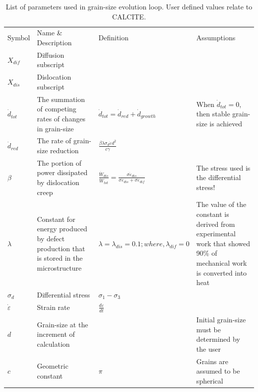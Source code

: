 \documentclass[]{scrreprt}
\begin{document}
\begin{table}
\centering
\captionsetup{justification=centering, font=footnotesize}
  \caption[inline]{List of parameters used in grain-size evolution loop. User defined values relate to CALCITE.}
\label{tab:grain_evo_params}

\begin{tabular}{| L{1.3cm} | C{3.95cm} | C{5.25cm} | C{4.95cm} |}
\hline\noalign{\smallskip}
Symbol & Name \& Description & Definition & Assumptions \\
\noalign{\smallskip}\hline\noalign{\smallskip}

$X_{dif}$ & {\small Diffusion subscript} &  &  \\

$X_{dis}$ & {\small Dislocation subscript} &  &  \\

$\dot{d}_{tot}$ & {\small The summation of competing rates of changes in grain-size} & $\dot{d}_{tot} = \dot{d}_{red} + \dot{d}_{growth}$ & {\small When $\dot{d}_{tot} = 0$, then stable grain-size is achieved} \\

$\dot{d}_{red}$ & {\small The rate of grain-size reduction} & $\frac{\beta\lambda\sigma_{d}\dot{\varepsilon}d^2}{c\gamma}$ &  \\

$\beta$ & {\small The portion of power dissipated by dislocation creep} & $\frac{\dot{W}_{dis}}{\dot{W}_{tot}} = \frac{\sigma\dot{\varepsilon}_{dis}}{\sigma\dot{\varepsilon}_{dis} + \sigma\dot{\varepsilon}_{dif}}$ & {\small The stress used is the differential stress!} \\

$\lambda$ & {\small Constant for energy produced by defect production that is stored in the microstructure} & $\lambda=\lambda_{dis}= 0.1;  where,   \lambda_{dif} = 0$ & {\small The value of the constant is derived from experimental work that showed 90\% of mechanical work is converted into heat \citep{Austin2009}}\\

$\sigma_{d}$ & {\small Differential stress} & $\sigma_{1} - \sigma_{3}$ &  \\

$\dot{\varepsilon}$ & {\small Strain rate} & $\frac{d\varepsilon}{dt}$ &  \\

$d$ & {\small Grain-size at the increment of calculation} &  & {\small Initial grain-size must be determined by the user} \\
$c$ & {\small Geometric constant} & $\pi$ & {\small Grains are assumed to be spherical \citep{Austin2009}} \\


\end{tabular}
\end{table}
\end{document}
